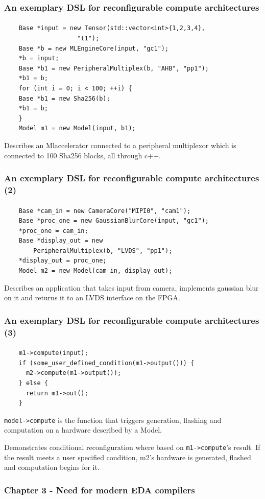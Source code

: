 \documentclass{beamer}
\begin{document}
\begin{frame}[fragile]
  \frametitle{An exemplary DSL for reconfigurable compute architectures}
\framesubtitle{}
  \begin{verbatim}
    Base *input = new Tensor(std::vector<int>{1,2,3,4}, 
                    "t1");
    Base *b = new MLEngineCore(input, "gc1");
    *b = input;
    Base *b1 = new PeripheralMultiplex(b, "AHB", "pp1");
    *b1 = b;
    for (int i = 0; i < 100; ++i) {
    Base *b1 = new Sha256(b);
    *b1 = b;
    }
    Model m1 = new Model(input, b1);
  \end{verbatim}

  Describes an Mlaccelerator connected to a peripheral multiplexor
  which is connected to 100 Sha256 blocks, all through c++.
\end{frame}

\begin{frame}[fragile]
  \frametitle{An exemplary DSL for reconfigurable compute architectures (2)}
\framesubtitle{}
  \begin{verbatim}
    Base *cam_in = new CameraCore("MIPI0", "cam1");
    Base *proc_one = new GaussianBlurCore(input, "gc1");
    *proc_one = cam_in;
    Base *display_out = new 
        PeripheralMultiplex(b, "LVDS", "pp1");
    *display_out = proc_one;
    Model m2 = new Model(cam_in, display_out);
  \end{verbatim}
  Describes an application that takes input from camera,
  implements gaussian blur on it and returns it to an LVDS interface on the
  FPGA.

\end{frame}

\begin{frame}[fragile]
  \frametitle{An exemplary DSL for reconfigurable compute architectures (3)}
\framesubtitle{}
  \begin{verbatim}
    m1->compute(input);
    if (some_user_defined_condition(m1->output())) {
      m2->compute(m1->output());
    } else {
      return m1->out();
    }
\end{verbatim}
  \texttt{model->compute} is the function that triggers generation, flashing and
  computation on a hardware described by a Model.

  Demonstrates conditional reconfiguration where based on \texttt{m1->compute}'s
  result. If the result meets a user specified condition, m2's hardware is
  generated, flashed and computation begins for it.
\end{frame}

\begin{frame}[fragile]
\frametitle{Chapter 3 - Need for modern EDA compilers}

\end{frame}
\end{document}
